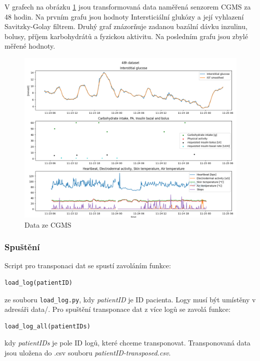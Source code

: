V grafech na obrázku \ref{fig:48h_dataset} jsou transformovaná data naměřená senzorem CGMS za 48 hodin. Na prvním grafu jsou hodnoty Intersticiální glukózy a její vyhlazení Savitzky-Golay filtrem. Druhý graf znázorňuje zadanou bazální dávku inzulinu, bolusy, příjem karbohydrátů a fyzickou aktivitu. Na posledním grafu jsou zbylé měřené hodnoty.

\begin{figure}[H]
\caption{Data ze CGMS}
\label{fig:48h_dataset}
\centering
\includegraphics[width=1\textwidth]{img/cho/48h_dataset.png}
\end{figure}

\subsubsection{Spuštění}
Script pro transponaci dat se spustí zavoláním funkce:
\begin{verbatim}
load_log(patientID)
\end{verbatim}
ze souboru \texttt{load\_log.py}, kdy \textit{patientID} je ID pacienta. Logy musí být umístěny v adresáři data/. Pro spuštění transponace dat z více logů se zavolá funkce:
\begin{verbatim}
load_log_all(patientIDs)
\end{verbatim}
kdy \textit{patientIDs} je pole ID logů, které chceme transponovat. Transponovaná data jsou uložena do .csv souboru \textit{patientID-transposed.csv}.

